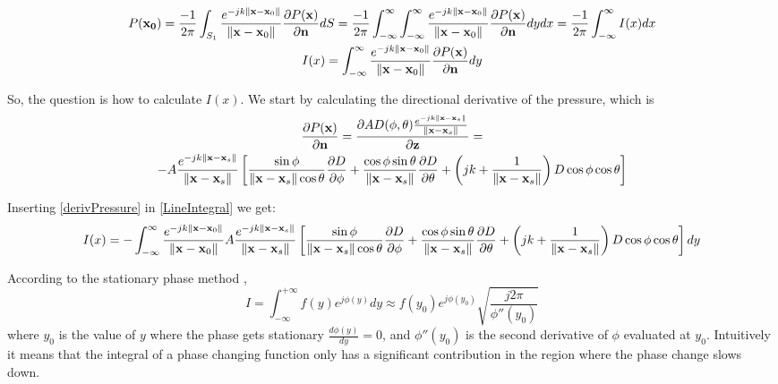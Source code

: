 \begin{gather}
P(\mathbf{x_0}) = \frac{-1}{2\pi} \int_{S_1} \frac{e^{-jk\left\| \mathbf{x} - \mathbf{x}_0 \right\|}}{\left\| \mathbf{x} - \mathbf{x}_0 \right\|} \frac{\partial P(\mathbf{x})}{\partial \mathbf{n}} dS = \frac{-1}{2\pi} \int_{-\infty}^{\infty} \int_{-\infty}^{\infty} \frac{e^{-jk\left\| \mathbf{x} - \mathbf{x}_0 \right\|}}{\left\| \mathbf{x} - \mathbf{x}_0 \right\|} \frac{\partial P(\mathbf{x})}{\partial \mathbf{n}} dy dx = \frac{-1}{2\pi} \int_{-\infty}^{\infty} I(x) dx \\
I(x) = \int_{-\infty}^{\infty} \frac{e^{-jk\left\| \mathbf{x} - \mathbf{x}_0 \right\|}}{\left\| \mathbf{x} - \mathbf{x}_0 \right\|} \frac{\partial P(\mathbf{x})}{\partial \mathbf{n}} dy
\label{LineIntegral}
\end{gather}

So, the question is how to calculate $I(x)$. We start by calculating the directional derivative of the pressure, which is \cite{Verheijen}
\begin{multline}
\frac{\partial P(\vec{x})}{\partial \mathbf{n}} = \frac{\partial \coef \Diag(\phi, \theta) \GreenFunc[\vec{x} - \vec{x}_s]}{\partial \mathbf{z}} = \\ -A \GreenFunc[\vec{x} - \vec{x}_s] \left[ \frac{\sin\phi}{\norm{\vec{x} - \vec{x}_s}\cos\theta}\frac{\partial\Diag}{\partial\phi} + \frac{\cos\phi \sin\theta}{\norm{\vec{x} - \vec{x}_s}} \frac{\partial\Diag}{\partial\theta} + \left(jk + \frac{1}{\norm{\vec{x} - \vec{x}_s}}\right) \Diag \cos\phi \cos\theta \right]
\label{derivPressure}
\end{multline}

Inserting \autoref{derivPressure} in \autoref{LineIntegral} we get:
\begin{equation}
I(x) = -\int_{-\infty}^{\infty} \GreenFunc[\vec{x} - \vec{x}_0] A \GreenFunc[\vec{x} - \vec{x}_s] \left[ \frac{\sin\phi}{\norm{\vec{x} - \vec{x}_s}\cos\theta}\frac{\partial\Diag}{\partial\phi} + \frac{\cos\phi \sin\theta}{\norm{\vec{x} - \vec{x}_s}} \frac{\partial\Diag}{\partial\theta} + \left(jk + \frac{1}{\norm{\vec{x} - \vec{x}_s}}\right) \Diag \cos\phi \cos\theta \right] dy
\label{integrateY}
\end{equation}

According to the stationary phase method \cite{Verheijen},
\begin{equation}
I = \int_{-\infty}^{+\infty} f(y) e^{j\phi(y)} dy \approx f(y_0) e^{j\phi(y_0)} \sqrt{\frac{j 2\pi}{\phi''(y_0)}}
\end{equation}
where $y_0$ is the value of $y$ where the phase gets stationary $\frac{d\phi(y)}{dy} = 0$, and $\phi''(y_0)$ is the second derivative of $\phi$ evaluated at $y_0$. Intuitively it means that the integral of a phase changing function only has a significant contribution in the region where the phase change slows down.

